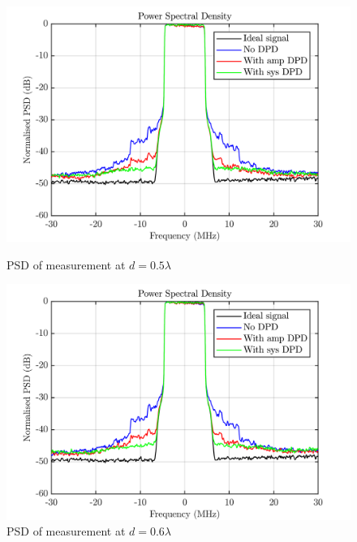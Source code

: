 \begin{figure}[H]
  \centering
  \begin{minipage}[b]{0.5\textwidth}
	\includegraphics[scale = 0.5]{figures/measurement/cree/meas3/psd_0p5.png}
	\caption{PSD of measurement at $d = 0.5\lambda$ }	
    \label{fig:meas3_psd3_2}
  \end{minipage}
  \hfill
  \begin{minipage}[b]{0.4\textwidth}
	\includegraphics[scale = 0.5]{figures/measurement/cree/meas3/psd_0p6.png}
	\caption{PSD of measurement at $d = 0.6\lambda$}
    \label{fig:meas3_psd4_2}
  \end{minipage}
\end{figure}


